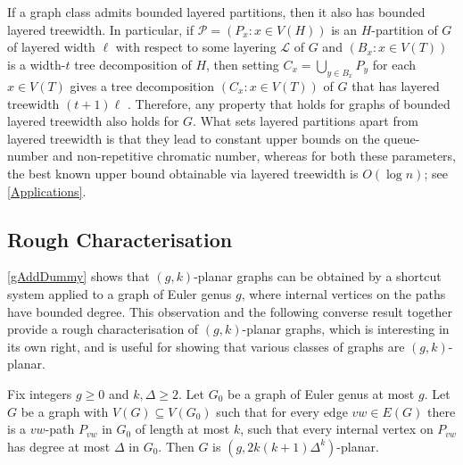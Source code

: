 \documentclass{patmorin}
\renewcommand{\geq}{\geqslant}
\begin{document}
If a graph class admits bounded layered partitions, then it also has bounded layered treewidth. In particular, if $\mathcal{P}=(P_x:x\in V(H))$ is an $H$-partition of $G$ of layered width $\ell$ with respect to some layering $\mathcal{L}$ of $G$ and $(B_x:x\in V(T))$ is a width-$t$ tree decomposition of $H$, then setting $C_x = \bigcup_{y\in B_x} P_y$ for each $x\in V(T)$ gives a tree decomposition $(C_x:x\in V(T))$ of $G$ that has layered treewidth $(t+1)\ell$ \cite{dujmovic.joret.ea:planar}.
Therefore, any property that holds for graphs of bounded layered treewidth also holds for $G$. What sets layered partitions apart from layered treewidth is that they lead to constant upper bounds on the queue-number  and non-repetitive chromatic number, whereas for both these parameters, the best known upper bound obtainable via layered treewidth is $O(\log n)$; see \cref{Applications}.


\subsection{Rough Characterisation}
\label{Characterisation}

\cref{gAddDummy} shows that $(g,k)$-planar graphs can be obtained by a shortcut system applied to a graph of Euler genus $g$, where internal vertices on the paths have bounded degree. This observation and the following converse result together provide a rough characterisation of $(g,k)$-planar graphs, which is interesting in its own right, and is useful for showing that various classes of graphs are $(g,k)$-planar. 

\begin{lem}
	\label{DrawG}
	Fix integers $g\geq 0$ and $k,\Delta\geq 2$.
	Let $G_0$ be a graph of Euler genus at most $g$. Let $G$ be
	a graph with $V(G) \subseteq V(G_0)$ such that for every edge $vw \in
	E(G)$ there is a $vw$-path $P_{vw}$ in $G_0$ of length at most $k$, such
	that every internal vertex on $P_{vw}$ has degree at most $\Delta$ in
	$G_0$. Then $G$ is $(g, 2k(k+1)\Delta^{k} )$-planar.
\end{lem}
\end{document}
